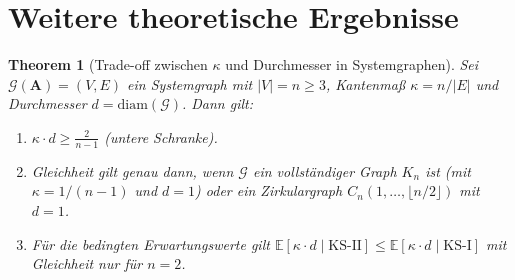 ﻿\documentclass[12pt, a4paper, titlepage]{report}
\newtheorem{theorem}{Theorem}[section]
\theoremstyle{definition}
\theoremstyle{remark}
\newcommand{\vA}{\bm{A}}
\newcommand{\KS}{\mathrm{KS}}
\begin{document}
\section{Weitere theoretische Ergebnisse}

\begin{theorem}[Trade-off zwischen $\kappa$ und Durchmesser in Systemgraphen]
\label{thm:tradeoff}
Sei $\mathcal{G}(\vA) = (V, E)$ ein Systemgraph mit $|V| = n \geq 3$, Kantenmaß
$\kappa = n/|E|$ und Durchmesser $d = \mathrm{diam}(\mathcal{G})$. Dann gilt:
\begin{enumerate}[label=(\roman*)]
  \item $\kappa \cdot d \geq \frac{2}{n-1}$ \quad (untere Schranke).
  \item Gleichheit gilt genau dann, wenn $\mathcal{G}$ ein vollständiger Graph
    $K_n$ ist (mit $\kappa = 1/(n-1)$ und $d = 1$) oder ein Zirkulargraph
    $C_n(1, \ldots, \lfloor n/2 \rfloor)$ mit $d = 1$.
  \item Für die bedingten Erwartungswerte gilt
    $\mathbb{E}[\kappa \cdot d \mid \KS\text{-II}] \leq
     \mathbb{E}[\kappa \cdot d \mid \KS\text{-I}]$
    mit Gleichheit nur für $n = 2$.
\end{enumerate}
\end{theorem}
\end{document}
